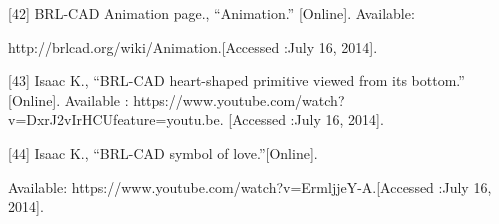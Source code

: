 \documentclass[11pt, oneside]{Thesis} %
\begin{document}
[42] BRL-CAD Animation page., “Animation.” [Online]. Available:

http://brlcad.org/wiki/Animation.[Accessed :July 16, 2014].

[43] Isaac K., “BRL-CAD heart-shaped primitive viewed from its bottom.” [Online].
Available : https://www.youtube.com/watch?v=DxrJ2vIrHCUfeature=youtu.be.
[Accessed :July 16, 2014].

[44] Isaac K., “BRL-CAD symbol of love.”[Online].

Available: https://www.youtube.com/watch?v=ErmljjeY-A.[Accessed :July 16, 2014].



\backmatter

\appendix %



\end{document}
